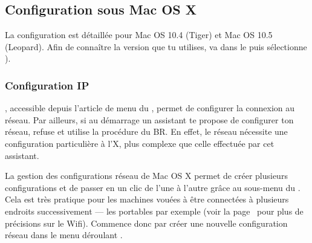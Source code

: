 

\subsection{Configuration sous Mac OS X}

La configuration est détaillée pour Mac OS 10.4 (Tiger) et Mac OS 10.5 (Leopard). Afin de connaître la version que tu utilises, va dans le  puis sélectionne ).

\subsubsection{Configuration IP}

 , accessible depuis l'article de menu  du , permet de configurer la connexion au réseau. Par ailleurs, si au démarrage un assistant te propose de configurer ton réseau, refuse et utilise la procédure du BR. En effet, le réseau nécessite une configuration particulière à l'X, plus complexe que celle effectu\'ee par cet assistant.

La gestion des configurations réseau de Mac OS X permet de créer plusieurs configurations et de passer en un clic de l'une à l'autre
grâce au sous-menu  du . Cela est très pratique pour les machines vouées à être connectées à plusieurs endroits successivement --- les portables par exemple (voir la page~\pageref{wifi} pour plus de précisions sur le Wifi). Commence donc par créer une nouvelle configuration réseau dans le menu déroulant .

